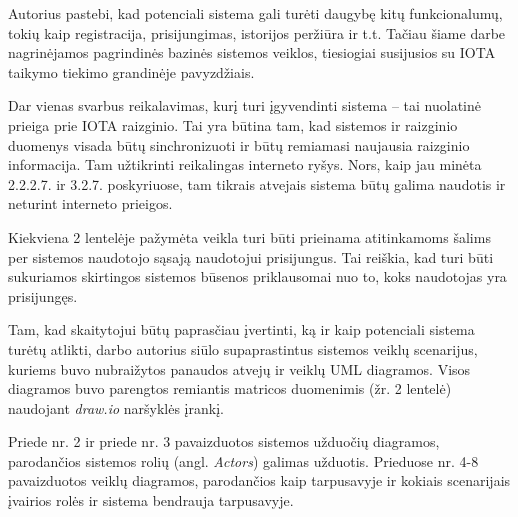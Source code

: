 Autorius pastebi, kad potenciali sistema gali turėti daugybę kitų funkcionalumų, tokių kaip registracija, prisijungimas, istorijos peržiūra ir t.t. Tačiau šiame darbe nagrinėjamos pagrindinės bazinės sistemos veiklos, tiesiogiai susijusios su IOTA taikymo tiekimo grandinėje pavyzdžiais. 

Dar vienas svarbus reikalavimas, kurį turi įgyvendinti sistema – tai nuolatinė prieiga prie IOTA raizginio. Tai yra būtina tam, kad sistemos ir raizginio duomenys visada būtų sinchronizuoti ir būtų remiamasi naujausia raizginio informacija. Tam užtikrinti reikalingas interneto ryšys. Nors, kaip jau minėta 2.2.2.7. ir 3.2.7. poskyriuose, tam tikrais atvejais sistema būtų galima naudotis ir neturint interneto prieigos.

Kiekviena 2 lentelėje pažymėta veikla turi būti prieinama atitinkamoms šalims per sistemos naudotojo sąsają naudotojui prisijungus. Tai reiškia, kad turi būti sukuriamos skirtingos sistemos būsenos priklausomai nuo to, koks naudotojas yra prisijungęs. 

Tam, kad skaitytojui būtų paprasčiau įvertinti, ką ir kaip potenciali sistema turėtų atlikti, darbo autorius siūlo supaprastintus sistemos veiklų scenarijus, kuriems buvo nubraižytos panaudos atvejų ir veiklų UML diagramos. Visos diagramos buvo parengtos remiantis matricos duomenimis (žr. 2 lentelė) naudojant \textit{draw.io} naršyklės įrankį. 

Priede nr. 2 ir priede nr. 3 pavaizduotos sistemos užduočių diagramos, parodančios sistemos rolių (angl. \textit{Actors}) galimas užduotis. Prieduose nr. 4-8 pavaizduotos veiklų diagramos, parodančios kaip tarpusavyje ir kokiais scenarijais įvairios rolės ir sistema bendrauja tarpusavyje.